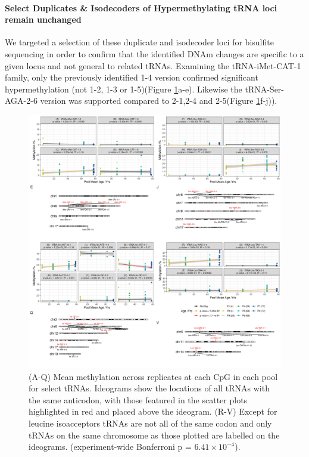 \documentclass[
]{book}
\begin{document}
\hypertarget{select-duplicates-isodecoders-of-hypermethylating-trna-loci-remain-unchanged}{%
\paragraph{Select Duplicates \& Isodecoders of Hypermethylating tRNA loci remain unchanged}\label{select-duplicates-isodecoders-of-hypermethylating-trna-loci-remain-unchanged}}

We targeted a selection of these duplicate and isodecoder loci for bisulfite sequencing in order to confirm that the identified DNAm changes are specific to a given locus and not general to related tRNAs.
Examining the tRNA-iMet-CAT-1 family, only the previously identified 1-4 version confirmed significant hypermethylation (not 1-2, 1-3 or 1-5)(Figure \ref{fig:combinedKaryoplots}a-e). Likewise the tRNA-Ser-AGA-2-6 version was supported compared to 2-1,2-4 and 2-5(Figure \ref{fig:combinedKaryoplots}f-j)).

\begin{figure}

{\centering \includegraphics[width=1\linewidth]{./figs/combinedKaryoplots_sig_bl} 

}

\caption{(A-Q) Mean methylation across replicates at each CpG in each pool for select tRNAs. Ideograms show the locations of all tRNAs with the same anticodon, with those featured in the scatter plots highlighted in red and placed above the ideogram. (R-V) Except for leucine isoacceptors tRNAs are not all of the same codon and only tRNAs on the same chromosome as those plotted are labelled on the ideograms. (experiment-wide Bonferroni p = \(6.41\times10^{-4}\)).}\label{fig:combinedKaryoplots}
\end{figure}
\end{document}
